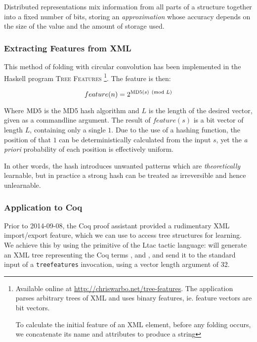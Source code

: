 Distributed representations mix information from all parts of a structure together into a fixed number of bits, storing an \emph{approximation} whose accuracy depends on the size of the value and the amount of storage used.

\subsubsection{Extracting Features from XML}

This method of folding with circular convolution has been implemented in the Haskell program \textsc{Tree Features} \footnote{Available online at \href{http://chriswarbo.net/git/tree-features}{http://chriswarbo.net/tree-features}. The application parses arbitrary trees of XML and uses binary features, ie. feature vectors are bit vectors.

To calculate the initial feature of an XML element, before any folding occurs, we concatenate its name and attributes to produce a string \hss}. The feature is then:

\begin{equation}
feature(n) = 2^{\md5(s) \pmod{L}}
\end{equation}

Where $\md5$ is the MD5 hash algorithm and $L$ is the length of the desired vector, given as a commandline argument. The result of $feature(s)$ is a bit vector of length $L$, containing only a single $1$. Due to the use of a hashing function, the position of that $1$ can be deterministically calculated from the input $s$, yet the \emph{a priori} probability of each position is effectively uniform.

In other words, the hash introduces unwanted patterns which are \emph{theoretically} learnable, but in practice a strong hash can be treated as irreversible and hence unlearnable.

\subsubsection{Application to Coq}

Prior to 2014-09-08, the Coq proof assistant provided a rudimentary XML import/export feature, which we can use to access tree structures for learning. We achieve this by using the  primitive of the Ltac tactic language:  will generate an XML tree representing the Coq terms ,  and , and send it to the standard input of a \texttt{treefeatures} invocation, using a vector length argument of 32.

